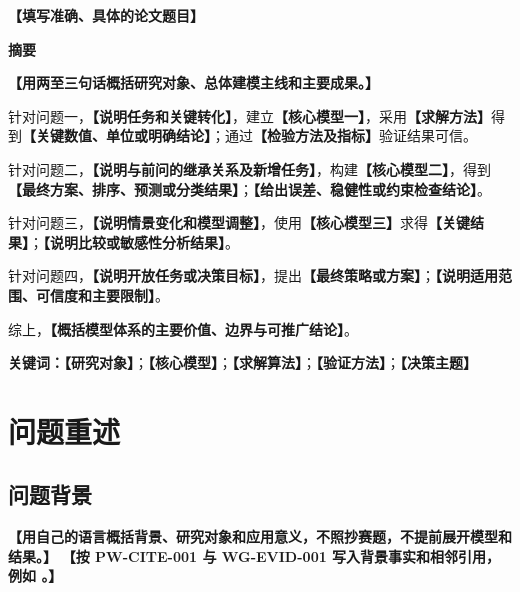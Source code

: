 \documentclass[UTF8,a4paper,12pt,zihao=-4]{ctexart}
\newcommand{\TemplateField}[1]{\textbf{【#1】}}
\newcommand{\PaperTitle}{\TemplateField{填写准确、具体的论文题目}}
\begin{document}
\setcounter{page}{1}

\thispagestyle{fancy}
\begin{center}
  {\bfseries{}\PaperTitle\par}
  \vspace{1.2em}
  {\bfseries{}摘要\par}
\end{center}

\indent\TemplateField{用两至三句话概括研究对象、总体建模主线和主要成果。}

针对问题一，\TemplateField{说明任务和关键转化}，建立\TemplateField{核心模型一}，采用\TemplateField{求解方法}得到\TemplateField{关键数值、单位或明确结论}；通过\TemplateField{检验方法及指标}验证结果可信。

针对问题二，\TemplateField{说明与前问的继承关系及新增任务}，构建\TemplateField{核心模型二}，得到\TemplateField{最终方案、排序、预测或分类结果}；\TemplateField{给出误差、稳健性或约束检查结论}。

针对问题三，\TemplateField{说明情景变化和模型调整}，使用\TemplateField{核心模型三}求得\TemplateField{关键结果}；\TemplateField{说明比较或敏感性分析结果}。

针对问题四，\TemplateField{说明开放任务或决策目标}，提出\TemplateField{最终策略或方案}；\TemplateField{说明适用范围、可信度和主要限制}。

综上，\TemplateField{概括模型体系的主要价值、边界与可推广结论}。

\vspace{0.8em}
\noindent\textbf{关键词：}\TemplateField{研究对象}；\TemplateField{核心模型}；\TemplateField{求解算法}；\TemplateField{验证方法}；\TemplateField{决策主题}

\clearpage

\section{问题重述}
\label{page:counted-first}
\label{text:counted-first}

\subsection{问题背景}
\TemplateField{用自己的语言概括背景、研究对象和应用意义，不照抄赛题，不提前展开模型和结果。}
\TemplateField{按 PW-CITE-001 与 WG-EVID-001 写入背景事实和相邻引用，例如 \cite{topic-ref-1,topic-ref-2}。}
\end{document}
